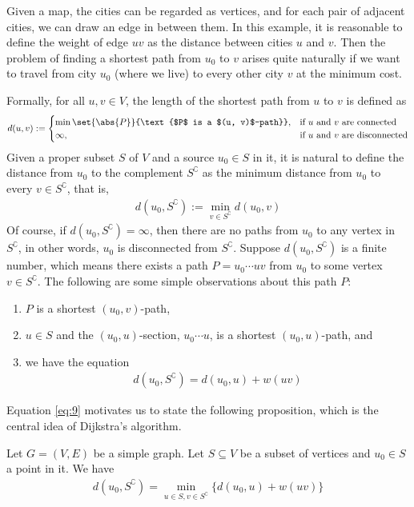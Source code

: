 \documentclass[thmcnt=section, 12pt, color=cyan]{my-elegantbook}
\begin{document}
Given a map, the cities can be regarded as vertices, and for each pair of adjacent cities, we can draw an edge in between them. In this example, it is reasonable to define the weight of edge $uv$ as the distance between cities $u$ and $v$. Then the problem of finding a shortest path from $u_0$ to $v$ arises quite naturally if we want to travel from city $u_0$ (where we live) to every other city $v$ at the minimum cost.

Formally, for all $u, v \in V$, the length of the shortest path from $u$ to $v$ is defined as 
\begin{align*}
    d(u,v) := 
    \begin{cases}
        \min \set{\abs{P}}{\text{$P$ is a $(u, v)$-path}} ,
        &\text{if $u$ and $v$ are connected} \\ 
        \infty,
        &\text{if $u$ and $v$ are disconnected}
    \end{cases}
\end{align*}
Given a proper subset $S$ of $V$ and a source $u_0 \in S$ in it, it is natural to define the distance from $u_0$ to the complement $S^\complement$ as the minimum distance from $u_0$ to every $v \in S^\complement$, that is,
\begin{align*}
    d(u_0, S^\complement) := \min_{v \in S^\complement} d(u_0, v)
\end{align*}
Of course, if $d(u_0, S^\complement) = \infty$, then there are no paths from $u_0$ to any vertex in $S^\complement$, in other words, $u_0$ is disconnected from $S^\complement$. Suppose $d(u_0, S^\complement)$ is a finite number, which means there exists a path $P = u_0 \cdots u v$ from $u_0$ to some vertex $v \in S^\complement$. The following are some simple observations about this path $P$:
\begin{enumerate}
    \item $P$ is a shortest $(u_0, v)$-path,
    \item $u \in S$ and the $(u_0, u)$-section, $u_0 \cdots u$, is a shortest $(u_0, u)$-path, and
    \item we have the equation
    \begin{align}
        d(u_0, S^\complement) = d(u_0, u) + w(uv)
        \label{eq:9}
    \end{align}
\end{enumerate}
Equation \eqref{eq:9} motivates us to state the following proposition, which is the central idea of Dijkstra's algorithm.

\begin{proposition} \label{pro:2}
    Let $G = (V, E)$ be a simple graph. Let $S \subseteq V$ be a subset of vertices and $u_0 \in S$ a point in it. We have 
    \begin{align}
        d(u_0, S^\complement)
        = \min_{u \in S, v \in S^\complement} \{
            d(u_0, u) + w(u v)
        \}
        \label{eq:5}
    \end{align}
\end{proposition}
\end{document}
